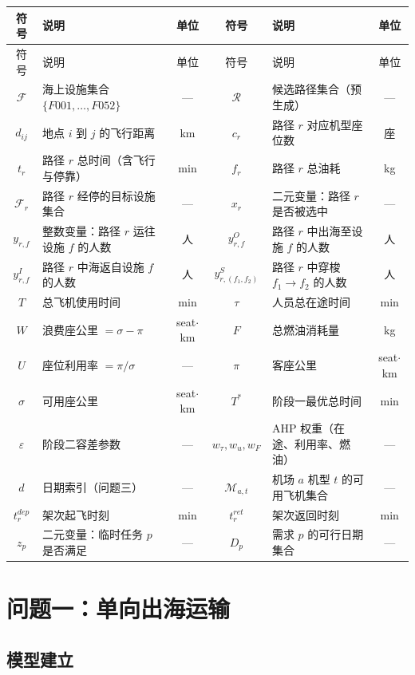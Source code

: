 \documentclass[withoutpreface]{cumcmthesis}
\begin{document}
\begin{longtable}{c p{4.2cm} c | c p{4.2cm} c}
\toprule
符号 & 说明 & 单位 & 符号 & 说明 & 单位 \\
\midrule
\endfirsthead
\toprule
符号 & 说明 & 单位 & 符号 & 说明 & 单位 \\
\midrule
\endhead
\bottomrule
\endfoot
\bottomrule
\endlastfoot
$\mathcal{F}$ & 海上设施集合 $\{F001, \ldots, F052\}$ & — &
$\mathcal{R}$ & 候选路径集合（预生成） & — \\
$d_{ij}$ & 地点 $i$ 到 $j$ 的飞行距离 & km &
$c_r$ & 路径 $r$ 对应机型座位数 & 座 \\
$t_r$ & 路径 $r$ 总时间（含飞行与停靠） & min &
$f_r$ & 路径 $r$ 总油耗 & kg \\
$\mathcal{F}_r$ & 路径 $r$ 经停的目标设施集合 & — &
$x_r$ & 二元变量：路径 $r$ 是否被选中 & — \\
$y_{r,f}$ & 整数变量：路径 $r$ 运往设施 $f$ 的人数 & 人 &
$y^{O}_{r,f}$ & 路径 $r$ 中出海至设施 $f$ 的人数 & 人 \\
$y^{I}_{r,f}$ & 路径 $r$ 中海返自设施 $f$ 的人数 & 人 &
$y^{S}_{r,(f_1,f_2)}$ & 路径 $r$ 中穿梭 $f_1 \to f_2$ 的人数 & 人 \\
$T$ & 总飞机使用时间 & min &
$\tau$ & 人员总在途时间 & min \\
$W$ & 浪费座公里 $= \sigma - \pi$ & seat$\cdot$km &
$F$ & 总燃油消耗量 & kg \\
$U$ & 座位利用率 $= \pi / \sigma$ & — &
$\pi$ & 客座公里 & seat$\cdot$km \\
$\sigma$ & 可用座公里 & seat$\cdot$km &
$T^*$ & 阶段一最优总时间 & min \\
$\varepsilon$ & 阶段二容差参数 & — &
$w_\tau, w_u, w_F$ & AHP 权重（在途、利用率、燃油） & — \\
$d$ & 日期索引（问题三） & — &
$\mathcal{M}_{a,t}$ & 机场 $a$ 机型 $t$ 的可用飞机集合 & — \\
$t^{dep}_r$ & 架次起飞时刻 & min &
$t^{ret}_r$ & 架次返回时刻 & min \\
$z_p$ & 二元变量：临时任务 $p$ 是否满足 & — &
$D_p$ & 需求 $p$ 的可行日期集合 & — \\
\end{longtable}

\section{ 问题一：单向出海运输}

\subsection{模型建立}
\end{document}
